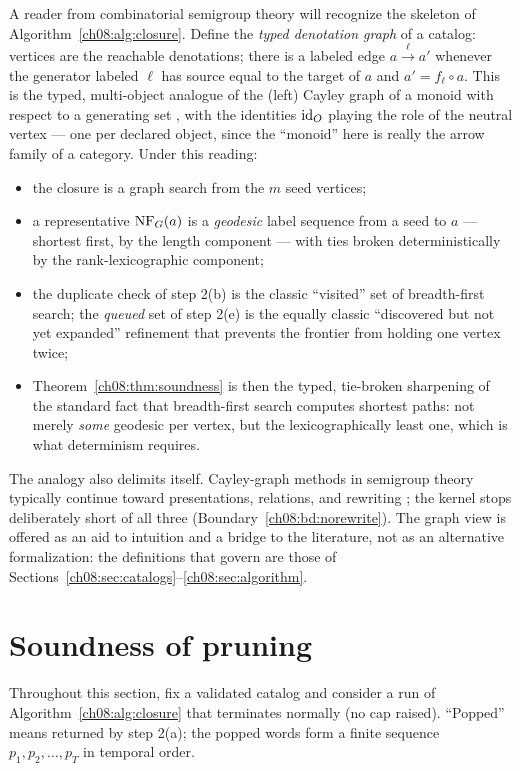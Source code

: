 A reader from combinatorial semigroup theory will recognize the skeleton of
Algorithm~\ref{ch08:alg:closure}. Define the \emph{typed denotation graph}
of a catalog: vertices are the reachable denotations; there is a labeled
edge $a\xrightarrow{\ \ell\ }a'$ whenever the generator labeled $\ell$ has
source equal to the target of $a$ and $a'=f_\ell\circ a$. This is the
typed, multi-object analogue of the (left) Cayley graph of a monoid with
respect to a generating set \cite{pin,howie}, with the identities $\mathrm{id}_O$
playing the role of the neutral vertex --- one per declared object, since
the ``monoid'' here is really the arrow family of a category. Under this
reading:
\begin{itemize}
\item the closure is a graph search from the $m$ seed vertices;
\item a representative $\mathrm{NF}_G(a)$ is a \emph{geodesic} label sequence from
  a seed to $a$ --- shortest first, by the length component --- with ties
  broken deterministically by the rank-lexicographic component;
\item the duplicate check of step 2(b) is the classic ``visited'' set of
  breadth-first search; the \emph{queued} set of step 2(e) is the equally
  classic ``discovered but not yet expanded'' refinement that prevents the
  frontier from holding one vertex twice;
\item Theorem~\ref{ch08:thm:soundness} is then the typed, tie-broken
  sharpening of the standard fact that breadth-first search computes
  shortest paths: not merely \emph{some} geodesic per vertex, but the
  lexicographically least one, which is what determinism requires.
\end{itemize}
The analogy also delimits itself. Cayley-graph methods in semigroup theory
typically continue toward presentations, relations, and rewriting
\cite{howie}; the kernel stops deliberately short of all three
(Boundary~\ref{ch08:bd:norewrite}). The graph view is offered as an aid to
intuition and a bridge to the literature, not as an alternative
formalization: the definitions that govern are those of
Sections~\ref{ch08:sec:catalogs}--\ref{ch08:sec:algorithm}.

\section{Soundness of pruning}\label{ch08:sec:soundness}

Throughout this section, fix a validated catalog and consider a run of
Algorithm~\ref{ch08:alg:closure} that terminates normally (no cap raised).
``Popped'' means returned by step 2(a); the popped words form a finite
sequence $p_1,p_2,\dots,p_T$ in temporal order.


